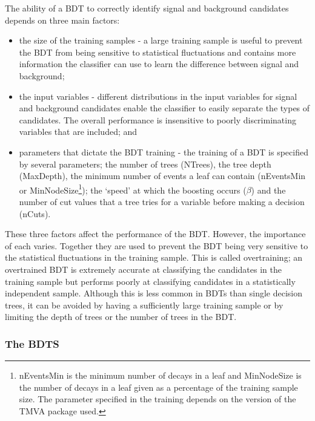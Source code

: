 The ability of a BDT to correctly identify signal and background candidates depends on three main factors:
\begin{itemize}
\item the size of the training samples - a large training sample is useful to prevent the BDT from being sensitive to statistical fluctuations and contains more information the classifier can use to learn the difference between signal and background;
\item the input variables - different distributions in the input variables for signal and background candidates enable the classifier to easily separate the types of candidates. The overall performance is insensitive to poorly discriminating variables that are included; and
\item parameters that dictate the BDT training - the training of a BDT is specified by several parameters; the number of trees (NTrees), the tree depth (MaxDepth), the minimum number of events a leaf can contain (nEventsMin or MinNodeSize\footnote{nEventsMin is the minimum number of decays in a leaf and MinNodeSize is the number of decays in a leaf given as a percentage of the training sample size. The parameter specified in the training depends on the version of the TMVA package used. }); the `speed’ at which the boosting occurs ($\beta$) and the number of cut values that a tree tries for a variable before making a decision (nCuts).
\end{itemize}

These three factors affect the performance of the BDT. However, the importance of each varies. Together they are used to prevent the BDT being very sensitive to the statistical fluctuations in the training sample. This is called overtraining; an overtrained BDT is extremely accurate at classifying the candidates in the training sample but performs poorly at classifying candidates in a statistically independent sample. Although this is less common in BDTs than single decision trees, it can be avoided by having a sufficiently large training sample or by limiting the depth of trees or the number of trees in the BDT. 

\subsubsection{The BDTS}
\label{BDTS}

